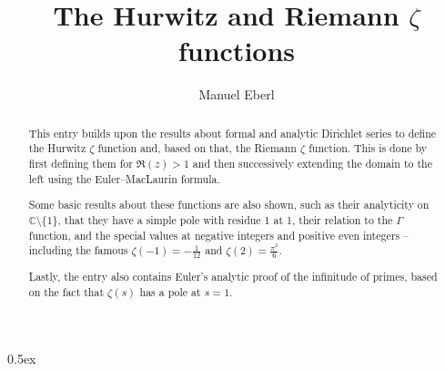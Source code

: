 \documentclass[11pt,a4paper]{article}
\begin{document}
\title{The Hurwitz and Riemann $\zeta$ functions}
\author{Manuel Eberl}
\maketitle

\begin{abstract}
This entry builds upon the results about formal and analytic Dirichlet series to define the Hurwitz $\zeta$ function and,
based on that, the Riemann $\zeta$ function. This is done by first defining them for $\mathfrak{R}(z) > 1$ and then successively
extending the domain to the left using the Euler--MacLaurin formula.

Some basic results about these functions are also shown, such as their analyticity on $\mathbb{C}\setminus\{1\}$, that they have a simple pole with residue 1 at 1, their relation to the $\Gamma$ function, and the special values at negative integers and positive even integers -- including the famous $\zeta(-1) = -\frac{1}{12}$ and $\zeta(2) = \frac{\pi^2}{6}$.

Lastly, the entry also contains Euler's analytic proof of the infinitude of primes, based on the fact that $\zeta(s)$ has a pole at $s = 1$.
\end{abstract}

\tableofcontents
\newpage
\parindent 0pt\parskip 0.5ex





\end{document}
